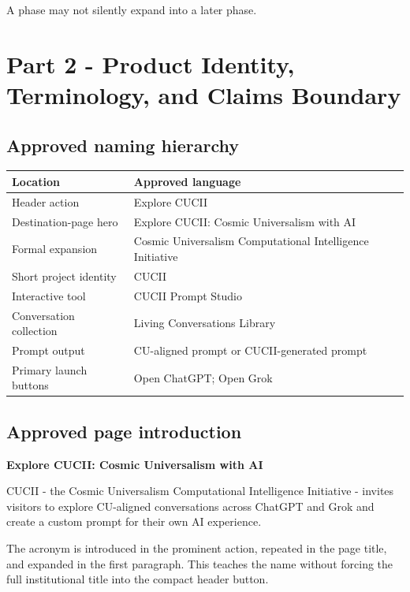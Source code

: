 \documentclass[11pt,letterpaper]{article}
\begin{document}
A phase may not silently expand into a later phase.

\section{Part 2 - Product Identity, Terminology, and Claims Boundary}

\subsection{Approved naming hierarchy}

\begin{tabularx}{\textwidth}{L{2.15in}Y}
\toprule
\textbf{Location} & \textbf{Approved language} \\
\midrule
Header action & Explore CUCII \\
Destination-page hero & Explore CUCII: Cosmic Universalism with AI \\
Formal expansion & Cosmic Universalism Computational Intelligence Initiative \\
Short project identity & CUCII \\
Interactive tool & CUCII Prompt Studio \\
Conversation collection & Living Conversations Library \\
Prompt output & CU-aligned prompt or CUCII-generated prompt \\
Primary launch buttons & Open ChatGPT; Open Grok \\
\bottomrule
\end{tabularx}

\subsection{Approved page introduction}

\begin{notebox}
\textbf{Explore CUCII: Cosmic Universalism with AI}

CUCII - the Cosmic Universalism Computational Intelligence Initiative -
invites visitors to explore CU-aligned conversations across ChatGPT and Grok
and create a custom prompt for their own AI experience.
\end{notebox}

The acronym is introduced in the prominent action, repeated in the page title,
and expanded in the first paragraph. This teaches the name without forcing the
full institutional title into the compact header button.
\end{document}
